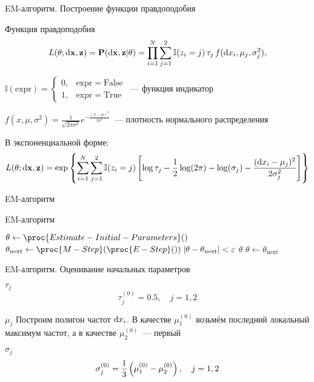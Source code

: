 \documentclass[utf8]{beamer}
\begin{document}
\begin{frame}{EM-алгоритм. Построение функции правдоподобия}
\begin{block}{Функция правдоподобия}
  $$
  L(\theta; \dif \mathbf{x}, \mathbf{z}) = 
    \mathbf{P}(\dif \mathbf{x}, \mathbf{z} \vert \theta) = 
    \prod\limits_{i=1}^{N} \sum\limits_{j=1}^2 
      \mathbb{I}(z_i=j) \, \tau_j \, f(\dif x_i,\mu_j,\sigma_j^2),
  $$

{\footnotesize
$\mathbb{I}(\mathrm{expr}) = \left\{
  \begin{array}{rl}
    0, & \mathrm{expr} = \mathrm{False} \\
    1, & \mathrm{expr} = \mathrm{True}
  \end{array}\right.$~--- функция индикатор

$f(x, \mu, \sigma^2) = 
    \frac{1}{\sqrt{2 \pi \sigma^2}} e^{-\frac{(x - \mu)^2}{2 \sigma^2}}$~---
плотность нормального распределения
}
\end{block}

В экспоненциальной форме:
{\small
$$
L(\theta; \dif \mathbf{x}, \mathbf{z}) =
  \exp \cbr{ \sum\limits_{i=1}^{N} \sum\limits_{j=1}^2 
    \mathbb{I}(z_i=j) \sbr{
      \log \tau_j - 
      \frac{1}{2}\log(2\pi) -
      \log(\sigma_j) -
      \frac{(\dif x_i - \mu_j)^2}{2 \sigma_j^2}}}
$$}
\end{frame}


\begin{frame}{EM-алгоритм}
\begin{block}{EM-алгоритм}
\begin{codebox}
\li $\theta \gets \proc{Estimate-Initial-Parameters}()$
\li \While {}
\li \Do
      $\theta_{\mathrm{next}} \gets \proc{M-Step}(\proc{E-Step}())$
\li   \If $\envert{\theta - \theta_{\mathrm{next}}} < \varepsilon$
\li   \Then
        \Return $\theta$
\li   \Else
        $\theta \gets \theta_{\mathrm{next}}$
      \End
    \End
\end{codebox}
\end{block}
\end{frame}


\begin{frame}{EM-алгоритм. Оценивание начальных параметров}
\begin{block}{$\tau_j$}
$$
\tau_j^{(0)} = 0.5, \quad j=1,2
$$
\end{block}
\begin{block}{$\mu_j$}
Построим полигон частот $\dif x_i$.
В качестве $\mu_1^{(0)}$ возьмём последний локальный максимум частот,
а в качестве $\mu_2^{(0)}$~--- первый
\end{block}
\begin{block}{$\sigma_j$}
$$\sigma_j^{(0)} = \frac{1}{3}\del{\mu_1^{(0)} - \mu_2^{(0)}}, \quad j=1, 2$$
\end{block}
\end{frame}
\end{document}
